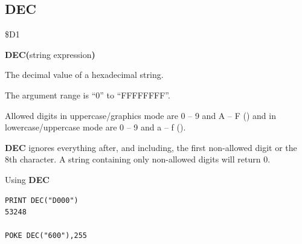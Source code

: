\subsection{DEC}
\begin{description}[leftmargin=2cm,style=nextline]
\item [Token:]    \$D1

\item [Format:]   {\bf DEC(}string expression{\bf)}

\item [Returns:]  The decimal value of a hexadecimal string.

                  The argument range is ``0'' to ``FFFFFFFF''.

\item [Remarks:]  Allowed digits in uppercase/graphics mode are 0 -- 9 and A -- F () and in lowercase/uppercase mode are 0 -- 9 and a -- f ().

                  {\bf DEC} ignores everything after, and including, the first non-allowed digit or the 8th character. A string containing only non-allowed digits will return 0.

\item [Examples:] Using {\bf DEC}

\begin{tcolorbox}[colback=black,coltext=white]
\verbatimfont{\codefont}
\begin{verbatim}
PRINT DEC("D000")
53248

POKE DEC("600"),255
\end{verbatim}
\end{tcolorbox}
\end{description}


\newpage
